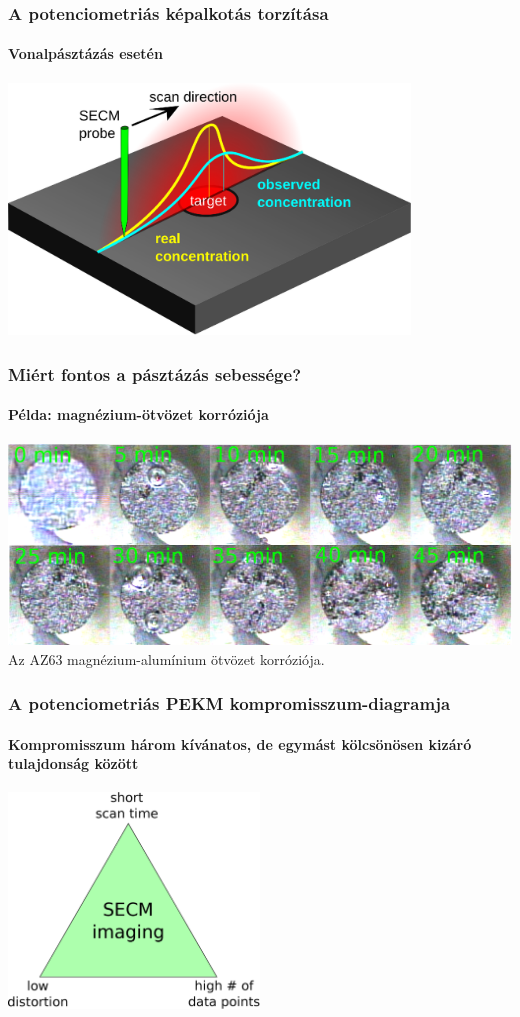 \documentclass{beamer}
\begin{document}
\begin{frame}
        \frametitle{A potenciometriás képalkotás torzítása}
        \framesubtitle{Vonalpásztázás esetén}
        \centering
        \includegraphics[width=0.8\textwidth]{distortion2.eps}
\end{frame}

\begin{frame}
        \frametitle{Miért fontos a pásztázás sebessége?}
        \framesubtitle{Példa: magnézium-ötvözet korróziója}
        \includegraphics[width=1\textwidth]{timelapse.eps}\\
\centering
Az AZ63 magnézium-alumínium ötvözet korróziója.
\end{frame}

\begin{frame}
\frametitle{A potenciometriás PEKM kompromisszum-diagramja}
\framesubtitle{Kompromisszum három kívánatos, de egymást kölcsönösen kizáró tulajdonság között}
\begin{center}
\includegraphics[width=0.5\textwidth]{trade-off.eps}
\end{center}
\end{frame}
\end{document}
